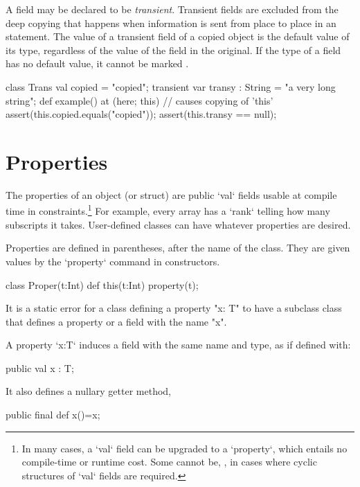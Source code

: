 A field may be declared to be {\em transient}.  Transient fields are excluded
from the deep copying that happens when information is sent from place to
place in an  statement.    The value of a transient field of a copied
object is the default value of its type, regardless of the value of the field
in the original.  If the type of a field has no
default value, it cannot be marked .
\begin{xten}
class Trans { 
   val copied = "copied";
   transient var transy : String = "a very long string";
   def example() {
      at (here; this) { // causes copying of 'this'
         assert(this.copied.equals("copied"));
         assert(this.transy == null);
      }
   }
}
\end{xten}
%


\section{Properties}
\label{PropertiesInClasses}

The properties of an object (or struct) are  public \xcd`val` fields
usable at compile time in constraints.\footnote{In many cases, a 
\xcd`val` field can be upgraded to a \xcd`property`, which 
entails no compile-time or runtime cost.  Some cannot be, \eg, in cases where
cyclic structures of \xcd`val` fields are required.} 
For example,  every array has a \xcd`rank` telling
how many subscripts it takes.  User-defined classes can have whatever
properties are desired. 

Properties are defined in parentheses, after the name of the class.  They are
given values by the \xcd`property` command in constructors.

\begin{xten}
class Proper(t:Int) {
  def this(t:Int) {property(t);}
}
\end{xten}
%




It is a static error for a class
defining a property \xcd"x: T" to have a subclass class that defines
a property or a field with the name \xcd"x".


A property \xcd`x:T` induces a field with the same name and type, 
as if defined with: 
\begin{xten}
public val x : T;
\end{xten} 
\noindent It also defines a nullary getter method, 
\begin{xten}
public final def x()=x;
\end{xten}





